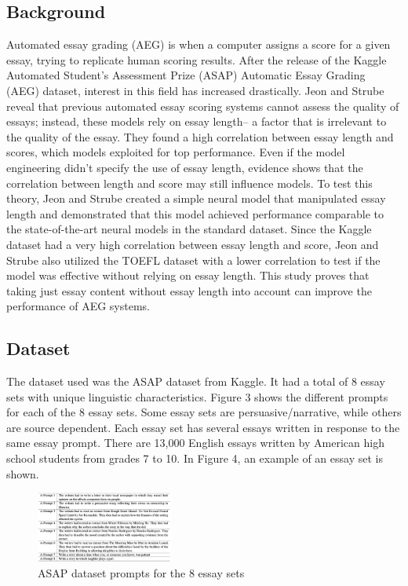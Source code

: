 \documentclass[11pt]{article}
\begin{document}
\subsection{Background}
Automated essay grading (AEG) is when a computer assigns a score for a given essay, trying to replicate human scoring results. After the release of the Kaggle Automated Student’s Assessment Prize (ASAP) Automatic Essay Grading (AEG) dataset, interest in this field has increased drastically. Jeon and Strube reveal that previous automated essay scoring systems cannot assess the quality of essays; instead, these models rely on essay length– a factor that is irrelevant to the quality of the essay. They found a high correlation between essay length and scores, which models exploited for top performance. Even if the model engineering didn’t specify the use of essay length, evidence shows that the correlation between length and score may still influence models. To test this theory, Jeon and Strube created a simple neural model that manipulated essay length and demonstrated that this model achieved performance comparable to the state-of-the-art neural models in the standard dataset. Since the Kaggle dataset had a very high correlation between essay length and score, Jeon and Strube also utilized the TOEFL dataset with a lower correlation to test if the model was effective without relying on essay length. This study proves that taking just essay content without essay length into account can improve the performance of AEG systems. 

\subsection{Dataset}
The dataset used was the ASAP dataset from Kaggle. It had a total of 8 essay sets with unique linguistic characteristics. Figure 3 shows the different prompts for each of the 8 essay sets. Some essay sets are persuasive/narrative, while others are source dependent. Each essay set has several essays written in response to the same essay prompt. There are 13,000 English essays written by American high school students from grades 7 to 10. In Figure 4, an example of an essay set is shown.


\begin{figure}
\centering
\includegraphics[width=0.4\textwidth]{prompts.png}
\caption{ASAP dataset prompts for the 8 essay sets}
\end{figure}
\end{document}

